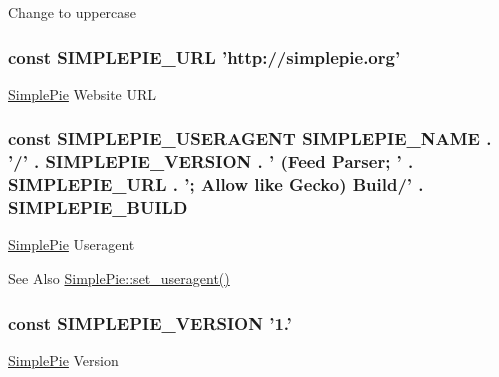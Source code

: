 Change to uppercase \hypertarget{simplepie_8inc_a90062b76fdd188ca507e7d2a2b296ce2}{
\subsubsection[{S\-I\-M\-P\-L\-E\-P\-I\-E\-\_\-\-U\-R\-L}]{\setlength{\rightskip}{0pt plus 5cm}const S\-I\-M\-P\-L\-E\-P\-I\-E\-\_\-\-U\-R\-L 'http\-://simplepie.\-org'}}\label{simplepie_8inc_a90062b76fdd188ca507e7d2a2b296ce2}
\hyperlink{class_simple_pie}{Simple\-Pie} Website U\-R\-L \hypertarget{simplepie_8inc_aa16b1a92eba4943f883b1f958edba8ef}{
\subsubsection[{S\-I\-M\-P\-L\-E\-P\-I\-E\-\_\-\-U\-S\-E\-R\-A\-G\-E\-N\-T}]{\setlength{\rightskip}{0pt plus 5cm}const S\-I\-M\-P\-L\-E\-P\-I\-E\-\_\-\-U\-S\-E\-R\-A\-G\-E\-N\-T {\bf S\-I\-M\-P\-L\-E\-P\-I\-E\-\_\-\-N\-A\-M\-E} . '/' . {\bf S\-I\-M\-P\-L\-E\-P\-I\-E\-\_\-\-V\-E\-R\-S\-I\-O\-N} . ' (Feed Parser; ' . {\bf S\-I\-M\-P\-L\-E\-P\-I\-E\-\_\-\-U\-R\-L} . '; Allow like Gecko) Build/' . {\bf S\-I\-M\-P\-L\-E\-P\-I\-E\-\_\-\-B\-U\-I\-L\-D}}}\label{simplepie_8inc_aa16b1a92eba4943f883b1f958edba8ef}
\hyperlink{class_simple_pie}{Simple\-Pie} Useragent \begin{DoxySeeAlso}{See Also}
\hyperlink{class_simple_pie_a383b3bff5c05ac2c5cfcfe2c888ad6d7}{Simple\-Pie\-::set\-\_\-useragent()} 
\end{DoxySeeAlso}
\hypertarget{simplepie_8inc_a02a6b6b545973012f91d3736686dc101}{
\subsubsection[{S\-I\-M\-P\-L\-E\-P\-I\-E\-\_\-\-V\-E\-R\-S\-I\-O\-N}]{\setlength{\rightskip}{0pt plus 5cm}const S\-I\-M\-P\-L\-E\-P\-I\-E\-\_\-\-V\-E\-R\-S\-I\-O\-N '1.'}}\label{simplepie_8inc_a02a6b6b545973012f91d3736686dc101}
\hyperlink{class_simple_pie}{Simple\-Pie} Version 